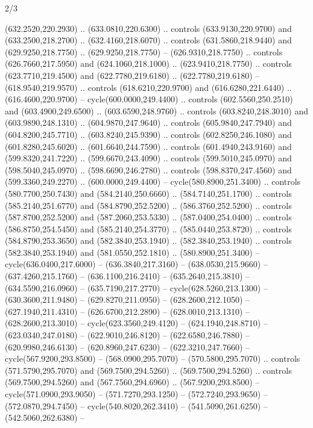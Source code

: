 \begin{flagdescription}{2/3}
\begin{scope}[xshift=0.5\flaglength,yshift=0.5\flagwidth,scale=\flagwidth/638.38]
\begin{scope}[y=0.80pt, x=0.80pt, yscale=-1,shift={(-600,-400)}]
\begin{scope}[shift={(-0.02,2.173)}]
  (632.2520,220.2930) .. (633.0810,220.6300) .. controls (633.9130,220.9700) and
  (633.2500,218.2700) .. (632.4160,218.6070) .. controls (631.5860,218.9440) and
  (629.9250,218.7750) .. (629.9250,218.7750) -- (626.9310,218.7750) .. controls
  (626.7660,217.5950) and (624.1060,218.1000) .. (623.9410,218.7750) .. controls
  (623.7710,219.4500) and (622.7780,219.6180) .. (622.7780,219.6180) --
  (618.9540,219.9570) .. controls (618.6210,220.9700) and (616.6280,221.6440) ..
  (616.4600,220.9700) -- cycle(600.0000,249.4400) .. controls
  (602.5560,250.2510) and (603.4900,249.6500) .. (603.6590,248.9760) .. controls
  (603.8240,248.3010) and (603.9890,248.1310) .. (604.9870,247.9640) .. controls
  (605.9840,247.7940) and (604.8200,245.7710) .. (603.8240,245.9390) .. controls
  (602.8250,246.1080) and (601.8280,245.6020) .. (601.6640,244.7590) .. controls
  (601.4940,243.9160) and (599.8320,241.7220) .. (599.6670,243.4090) .. controls
  (599.5010,245.0970) and (598.5040,245.0970) .. (598.6690,246.2780) .. controls
  (598.8370,247.4560) and (599.3360,249.2270) .. (600.0000,249.4400) --
  cycle(580.8900,251.3400) .. controls (580.7700,250.7430) and
  (584.2140,250.6660) .. (584.7140,251.1700) .. controls (585.2140,251.6770) and
  (584.8790,252.5200) .. (586.3760,252.5200) .. controls (587.8700,252.5200) and
  (587.2060,253.5330) .. (587.0400,254.0400) .. controls (586.8750,254.5450) and
  (585.2140,254.3770) .. (585.0440,253.8720) .. controls (584.8790,253.3650) and
  (582.3840,253.1940) .. (582.3840,253.1940) .. controls (582.3840,253.1940) and
  (581.0550,252.1810) .. (580.8900,251.3400) -- cycle(636.0400,217.6000) --
  (636.3840,217.3160) -- (638.0530,215.9660) -- (637.4260,215.1760) --
  (636.1100,216.2410) -- (635.2640,215.3810) -- (634.5590,216.0960) --
  (635.7190,217.2770) -- cycle(628.5260,213.1300) -- (630.3600,211.9480) --
  (629.8270,211.0950) -- (628.2600,212.1050) -- (627.1940,211.4310) --
  (626.6700,212.2890) -- (628.0010,213.1310) -- (628.2600,213.3010) --
  cycle(623.3560,249.4120) -- (624.1940,248.8710) -- (623.0340,247.0180) --
  (622.9010,246.8120) -- (622.6580,246.7880) -- (620.9980,246.6130) --
  (620.8960,247.6230) -- (622.3210,247.7660) -- cycle(567.9200,293.8500) --
  (568.0900,295.7070) -- (570.5800,295.7070) .. controls (571.5790,295.7070) and
  (569.7500,294.5260) .. (569.7500,294.5260) .. controls (569.7500,294.5260) and
  (567.7560,294.6960) .. (567.9200,293.8500) -- cycle(571.0900,293.9050) --
  (571.7270,293.1250) -- (572.7240,293.9650) -- (572.0870,294.7450) --
  cycle(540.8020,262.3410) -- (541.5090,261.6250) -- (542.5060,262.6380) --

\end{scope}
\end{scope}
\end{scope}
\end{flagdescription}
